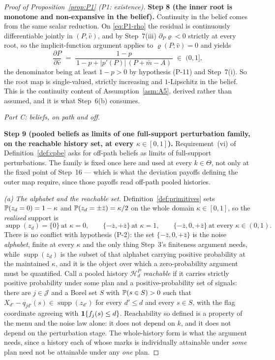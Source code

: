 \begin{proof}[Proof of Proposition~\ref{prop:P1} (P1: existence)]
\smallskip
\noindent\textbf{Step 8 (the inner root is monotone and non-expansive in the belief).}
Continuity in the belief comes from the same scalar reduction. On \eqref{eq:P1-rho} the residual is
continuously differentiable jointly in $(P,\hat v)$, and by Step~7(iii) $\partial_P\varrho < 0$
strictly at every root, so the implicit-function argument applies to $\varrho(P;\hat v) = 0$ and
yields
\begin{equation}
\label{eq:P1-dP}
\frac{\partial P}{\partial \hat v}
\;=\; \frac{1-p}{\,1-p+\lvert p'(P)\rvert\,(P+\bar m-A)\,}
\;\in\; (0,1],
\end{equation}
the denominator being at least $1-p > 0$ by hypothesis (P-11) and Step~7(i). So the root map is
single-valued, strictly increasing and $1$-Lipschitz in the belief. This is the continuity content of
Assumption~\ref{asm:A5}, derived rather than assumed, and it is what Step~6(b) consumes.

\medskip
\noindent\emph{Part C: beliefs, on path and off.}

\smallskip
\noindent\textbf{Step 9 (pooled beliefs as limits of one full-support perturbation family, on the
reachable history set, at every $\kappa \in [0,1]$).}
Requirement~(vi) of Definition~\ref{def:cpbe} asks for off-path beliefs as limits of full-support
perturbations. The family is fixed once here and used at every $k \in \Theta$, not only at the fixed
point of Step~16 --- which is what the deviation payoffs defining the outer map require, since those
payoffs read off-path pooled histories.

\emph{(a) The alphabet and the reachable set.} Definition~\ref{def:primitives} sets
$\mathbb{P}(z_d = 0) = 1-\kappa$ and $\mathbb{P}(z_d = \pm\bar z) = \kappa/2$ on the whole domain
$\kappa \in [0,1]$, so the \emph{realised} support is
\[
\operatorname{supp}(z_d) = \{0\} \ \text{at } \kappa = 0,
\qquad
\{-\bar z,+\bar z\} \ \text{at } \kappa = 1,
\qquad
\{-\bar z,0,+\bar z\} \ \text{at every } \kappa \in (0,1).
\]
There is no conflict with hypothesis (P-2): the set $\{-\bar z,0,+\bar z\}$ is the noise
\emph{alphabet}, finite at every $\kappa$ and the only thing Step~3's finiteness argument needs,
while $\operatorname{supp}(z_d)$ is the subset of that alphabet carrying positive probability at the
maintained $\kappa$, and it is the object over which a zero-probability argument must be quantified.
Call a pooled history $\mathcal H_d^P$ \emph{reachable} if it carries strictly positive probability
under some plan and a positive-probability set of signals: there are $j \in \mathcal J$ and a Borel
set $S$ with $\mathbb{P}(s \in S) > 0$ such that $X_{d'}-q_{jd'}(s) \in \operatorname{supp}(z_{d'})$ for
every $d' \le d$ and every $s \in S$, with the flag coordinate agreeing with $\mathbf{1}\{f_j(s) \le d\}$.
Reachability so defined is a property of the menu and the noise law alone: it does not depend on $k$,
and it does not depend on the perturbation stage. The whole-history form is what the argument needs,
since a history each of whose marks is individually attainable under \emph{some} plan need not be
attainable under any \emph{one} plan.


\end{proof}
